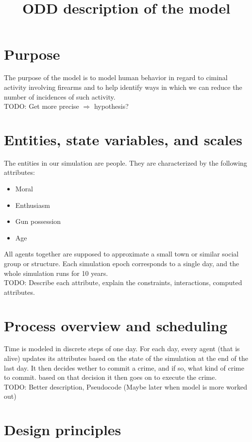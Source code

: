 \documentclass{article}
\title{ODD description of the model}
\begin{document}
	\maketitle

	\section{Purpose}
		The purpose of the model is to model human behavior in regard to ciminal activity involving
		firearms and to help identify ways in which we can reduce the number of incidences of such
		activity.\\
		TODO: Get more precise $\Rightarrow$ hypothesis?

	\section{Entities, state variables, and scales}
		The entities in our simulation are people. They are characterized by the following attributes:

		\begin{itemize}
			\item Moral
			\item Enthusiasm
			\item Gun possession
			\item Age
		\end{itemize}

		All agents together are supposed to approximate a small town or similar social group or structure.
		Each simulation epoch corresponds to a single day, and the whole simulation runs for 10 years.\\
		TODO: Describe each attribute, explain the constraints, interactions, computed attributes.

	\section{Process overview and scheduling}
		Time is modeled in discrete steps of one day. For each day, every agent (that is alive)
		updates its attributes based on the state of the simulation at the end of the last day.
		It then decides wether to commit a crime, and if so, what kind of crime to commit. based
		on that decision it then goes on to execute the crime.\\
		TODO: Better description, Pseudocode (Maybe later when model is more worked out)

	\section{Design principles}
\end{document}
